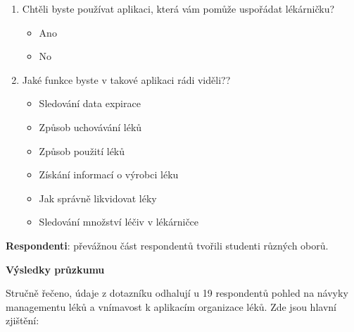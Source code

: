 \documentclass[a4paper, 11pt]{article}
\begin{document}
\begin{enumerate}
\item Chtěli byste používat aplikaci, která vám pomůže uspořádat lékárničku?
\begin{itemize}
\item Ano
\item No
\end{itemize}
\item Jaké funkce byste v takové aplikaci rádi viděli??
\begin{itemize}
\item Sledování data expirace
\item Způsob uchovávání léků
\item Způsob použití léků
\item Získání informací o výrobci léku
\item Jak správně likvidovat léky
\item Sledování množství léčiv v lékárničce
\end{itemize}
\end{enumerate}

\textbf {Respondenti}: převážnou část respondentů tvořili studenti různých oborů.

\textbf {Výsledky průzkumu}

Stručně řečeno, údaje z dotazníku odhalují u 19 respondentů pohled na návyky managementu léků a vnímavost k aplikacím organizace léků. Zde jsou hlavní zjištění:
\end{document}
